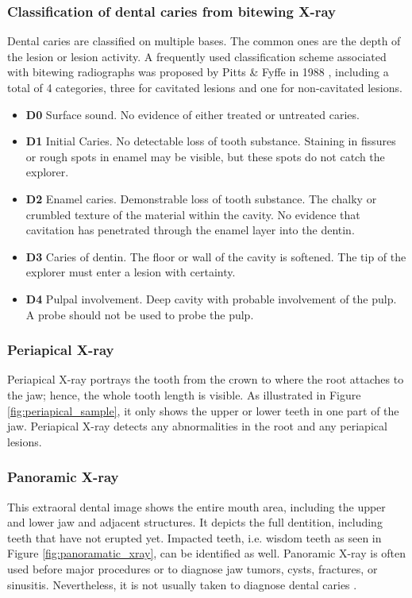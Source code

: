 \subsubsection{Classification of dental caries from bitewing X-ray}
\label{sec:caries_classification}
Dental caries are classified on multiple bases. The common ones are the depth of the lesion or lesion activity. \newline
A frequently used classification scheme associated with bitewing radiographs was proposed by Pitts \& Fyffe in 1988 \cite{2019a}, including a total of 4 categories, three for cavitated lesions and one for non-cavitated lesions.
\begin{itemize}
    \item \textbf{D0} Surface sound. No evidence of either treated or untreated caries.
    \item \textbf{D1} Initial Caries. No detectable loss of tooth substance. Staining in fissures or rough spots in enamel may be visible, but these spots do not catch the explorer.
    \item \textbf{D2} Enamel caries. Demonstrable loss of tooth substance. The chalky or crumbled texture of the material within the cavity. No evidence that cavitation has penetrated through the enamel layer into the dentin.
    \item \textbf{D3} Caries of dentin. The floor or wall of the cavity is softened. The tip of the explorer must enter a lesion with certainty.
    \item \textbf{D4} Pulpal involvement. Deep cavity with probable involvement of the pulp. A probe should not be used to probe the pulp.
\end{itemize}

\subsubsection{Periapical X-ray}
Periapical X-ray portrays the tooth from the crown to where the root attaches to the jaw; hence, the whole tooth length is visible. As illustrated in Figure \ref{fig:periapical_sample}, it only shows the upper or lower teeth in one part of the jaw.  Periapical X-ray detects any abnormalities in the root and any periapical lesions.

\subsubsection{Panoramic X-ray}
This extraoral dental image shows the entire mouth area, including the upper and lower jaw and adjacent structures. It depicts the full dentition, including teeth that have not erupted yet. Impacted teeth, i.e. wisdom teeth as seen in Figure \ref{fig:panoramatic_xray}, can be identified as well. Panoramic X-ray is often used before major procedures or to diagnose jaw tumors, cysts, fractures, or sinusitis. Nevertheless, it is not usually taken to diagnose dental caries \cite{clevland_xray}.

